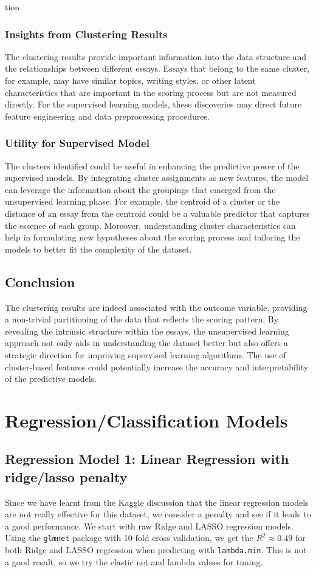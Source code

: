 tion\documentclass[8pt]{article}
\begin{document}
\begin{enumerate}
\subsubsection{Insights from Clustering Results}
The clustering results provide important information into the data structure and the relationships between different essays. Essays that belong to the same cluster, for example, may have similar topics, writing styles, or other latent characteristics that are important in the scoring process but are not measured directly. For the supervised learning models, these discoveries may direct future feature engineering and data preprocessing procedures.

\subsubsection{Utility for Supervised Model}
The clusters identified could be useful in enhancing the predictive power of the supervised models. By integrating cluster assignments as new features, the model can leverage the information about the groupings that emerged from the unsupervised learning phase. For example, the centroid of a cluster or the distance of an essay from the centroid could be a valuable predictor that captures the essence of each group. Moreover, understanding cluster characteristics can help in formulating new hypotheses about the scoring process and tailoring the models to better fit the complexity of the dataset.

\subsection{Conclusion}
The clustering results are indeed associated with the outcome variable, providing a non-trivial partitioning of the data that reflects the scoring pattern. By revealing the intrinsic structure within the essays, the unsupervised learning approach not only aids in understanding the dataset better but also offers a strategic direction for improving supervised learning algorithms. The use of cluster-based features could potentially increase the accuracy and interpretability of the predictive models.



\section{Regression/Classification Models}

\subsection{Regression Model 1: Linear Regression with ridge/lasso penalty}
Since we have learnt from the Kaggle discussion that the linear regression models are not really effective for this dataset, 
we consider a penalty and see if it leads to a good performance. 
We start with raw Ridge and LASSO regression models. Using the \texttt{glmnet} package with 10-fold cross validation, 
we get the $R^2 \approx 0.49$ for both Ridge and LASSO regression when predicting with \texttt{lambda.min}. 
This is not a good result, so we try the elastic net and lambda values for tuning. 

\end{enumerate}
\end{document}
